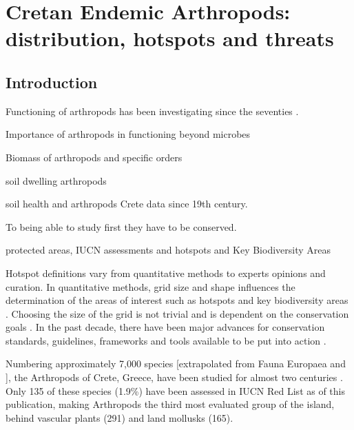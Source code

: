 % 
% 


\chapter{Cretan Endemic Arthropods: distribution, hotspots and threats}
\label{cha:arthropods}

\section{Introduction}
\label{sec:arthropods-intro}

Functioning of arthropods has been investigating since the seventies \parencite{rosswall1997energetical}.

Importance of arthropods in functioning
\parencite{GRANDY201640} beyond microbes
\parencite{COLEMAN2024131}

\parencite{Fry2019}
\parencite{briones2014soilfauna}

Biomass of arthropods and specific orders 
\parencite{milo-arthropods}
\parencite{bar2018biomass}

soil dwelling arthropods

soil health and arthropods
\parencite{insects11010054}
Crete data since 19th century. 

To being able to study first they have to be conserved.

protected areas, IUCN assessments and hotspots and Key Biodiversity Areas


Hotspot definitions vary from quantitative methods to experts opinions and curation.
In quantitative methods, grid size and shape influences the determination of
the areas of interest such as hotspots and key biodiversity areas \parencite{hurlbert2007species,nhancale2011the-influence}.
Choosing the size of the grid is not trivial \parencite{mo2019influences} and is dependent
on the conservation goals \parencite{margules2000systematic}. In the past decade,
there have been major advances for conservation standards, guidelines,
frameworks and tools available to be put into action \parencite{bongaarts2019ipbes}.


Numbering approximately 7,000 species [extrapolated from Fauna Europaea
\parencite{jong2014fauna} and \textcite{legakis2018}], the Arthropods of Crete, Greece,
have been studied for almost two centuries \parencite{Anastasiou2018Tenebrionid}.
Only 135 of these species (1.9\%) have been assessed in IUCN Red List as of
this publication, making Arthropods the third most evaluated group of the
island, behind vascular plants (291) and land mollusks (165).

